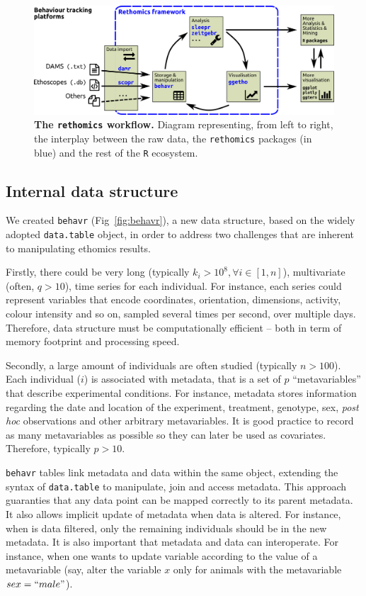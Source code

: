 \documentclass[10pt,letterpaper]{article}
\begin{document}
     
\begin{figure}[!h]
    \includegraphics[width=1\textwidth]{fig/framework.pdf}
	\caption{{\bf The \texttt{rethomics} workflow.}
		Diagram representing, from left to right, the interplay between the raw data, the \texttt{rethomics} packages (in blue) and the rest of the \texttt{R} ecosystem.}
	\label{fig:framework}
\end{figure}


\subsection*{Internal data structure}
We created \texttt{behavr} (Fig~\ref{fig:behavr}), a new data structure, based on the widely adopted \texttt{data.table} object, in order to address 
two challenges that are inherent to manipulating ethomics results.

Firstly, there could be very long (typically $k_i > 10^8, \forall i \in [1,n]$), multivariate (often, $q > 10$), time series for each individual.
For instance, each series could represent variables that encode coordinates, orientation, dimensions, activity, colour intensity and so on, sampled several times per second, over multiple days. Therefore, data structure must be computationally efficient -- both in term of memory footprint and processing speed. 

Secondly, a large amount of individuals are often studied (typically $n > 100$).
Each individual ($i$) is associated with metadata, that is a set of $p$ ``metavariables'' that describe experimental conditions.
For instance, metadata stores information regarding the date and location of the experiment, treatment, genotype, sex, \emph{post hoc} observations and other arbitrary metavariables.
It is good practice to record as many metavariables as possible so they can later be used as covariates. 
Therefore, typically $p > 10$.
 
\texttt{behavr} tables link metadata and data within the same object, extending the syntax of \texttt{data.table} to manipulate, join and access metadata.
This approach guaranties that any data point can be mapped correctly to its parent metadata.
It also allows implicit update of metadata when data is altered.
For instance, when is data filtered, only the remaining individuals should be in the new metadata. 
It is also important that metadata and data can interoperate.
For instance, when one wants to update variable according to the value of a metavariable (say, alter the variable $x$ only for animals with the metavariable $sex=``male"$).
\end{document}
